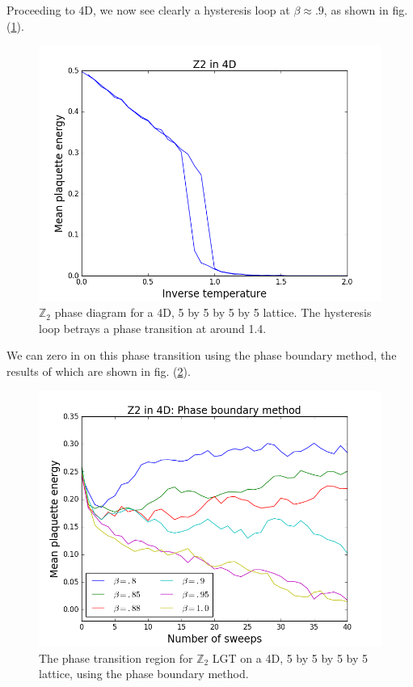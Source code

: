 \documentclass[9pt,twocolumn,twoside]{article}
\begin{document}
Proceeding to 4D, we now see clearly a hysteresis loop at $\beta \approx .9$, as shown in fig. (\ref{z2,4d}).
\begin{figure}[h!]
	\begin{centering}
	\includegraphics[width=\columnwidth]{z2,4d}
	\caption{$\mathbb{Z}_2$ phase diagram for a 4D, 5 by 5 by 5 by 5 lattice.  The hysteresis loop betrays a phase transition at around 1.4.}
	\label{z2,4d}
	\end{centering}
\end{figure}
We can zero in on this phase transition using the phase boundary method, the results of which are shown in fig. (\ref{z2,4d,phase}).
\begin{figure}[h!]
	\begin{centering}
	\includegraphics[width=\columnwidth]{z2,4d,phase}
	\caption{The phase transition region for $\mathbb{Z}_2$ LGT on a 4D, 5 by 5 by 5 by 5 lattice, using the phase boundary method.}
	\label{z2,4d,phase}
	\end{centering}
\end{figure}
\end{document}
